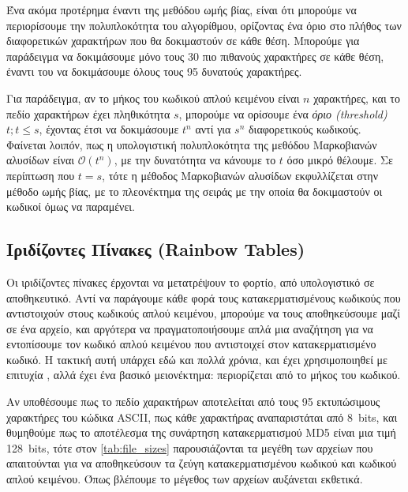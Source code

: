 \documentclass[11pt]{article}
\begin{document}
Ένα ακόμα προτέρημα έναντι της μεθόδου ωμής βίας, είναι ότι μπορούμε να περιορίσουμε την πολυπλοκότητα του αλγορίθμου, ορίζοντας ένα όριο στο πλήθος των διαφορετικών χαρακτήρων που θα δοκιμαστούν σε κάθε θέση. Μπορούμε για παράδειγμα να δοκιμάσουμε μόνο τους 30 πιο πιθανούς χαρακτήρες σε κάθε θέση, έναντι του να δοκιμάσουμε όλους τους 95 δυνατούς χαρακτήρες.

Για παράδειγμα, αν το μήκος του κωδικού απλού κειμένου είναι $n$ χαρακτήρες, και το πεδίο χαρακτήρων έχει πληθικότητα $s$, μπορούμε να ορίσουμε ένα \textit{όριο (threshold)} $t; t \le s$, έχοντας έτσι να δοκιμάσουμε $t^n$ αντί για $s^n$ διαφορετικούς κωδικούς. Φαίνεται λοιπόν, πως η υπολογιστική πολυπλοκότητα της μεθόδου Μαρκοβιανών αλυσίδων είναι $\mathcal{O}(t^n)$, με την δυνατότητα να κάνουμε το $t$ όσο μικρό θέλουμε. Σε περίπτωση που $t=s$, τότε η μέθοδος Μαρκοβιανών αλυσίδων εκφυλλίζεται στην μέθοδο ωμής βίας, με το πλεονέκτημα της σειράς με την οποία θα δοκιμαστούν οι κωδικοί όμως να παραμένει.

\subsection{Ιριδίζοντες Πίνακες (Rainbow Tables)}

Οι ιριδίζοντες πίνακες έρχονται να μετατρέψουν το φορτίο, από υπολογιστικό σε αποθηκευτικό. Αντί να παράγουμε κάθε φορά τους κατακερματισμένους κωδικούς που αντιστοιχούν στους κωδικούς απλού κειμένου, μπορούμε να τους αποθηκεύσουμε μαζί σε ένα αρχείο, και αργότερα να πραγματοποιήσουμε απλά μια αναζήτηση για να εντοπίσουμε τον κωδικό απλού κειμένου που αντιστοιχεί στον κατακερματισμένο κωδικό. Η τακτική αυτή υπάρχει εδώ και πολλά χρόνια, και έχει χρησιμοποιηθεί με επιτυχία \cite{wiki:rainbow_table}, αλλά έχει ένα βασικό μειονέκτημα: περιορίζεται από το μήκος του κωδικού.

Αν υποθέσουμε πως το πεδίο χαρακτήρων αποτελείται από τους 95 εκτυπώσιμους χαρακτήρες του κώδικα ASCII, πως κάθε χαρακτήρας αναπαριστάται από \SI{8}{bits}, και θυμηθούμε πως το αποτέλεσμα της συνάρτηση κατακερματισμού MD5 είναι μια τιμή \SI{128}{bits}, τότε στον \autoref{tab:file_sizes} παρουσιάζονται τα μεγέθη των αρχείων που απαιτούνται για να αποθηκεύσουν τα ζεύγη κατακερματισμένου κωδικού και κωδικού απλού κειμένου. Όπως βλέπουμε το μέγεθος των αρχείων αυξάνεται εκθετικά.
\end{document}
